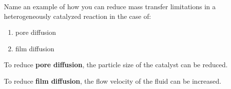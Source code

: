 
\begin{question}
Name an example of how you can reduce mass transfer limitations in a heterogeneously catalyzed reaction in the case of:
\renewcommand{\labelenumi}{(\alph{enumi})}
\begin{enumerate}
\item pore diffusion
\item film diffusion
\end{enumerate}
\end{question}

\begin{solution}
To reduce \textbf{pore diffusion}, the particle size of the catalyst can be reduced. 

To reduce \textbf{film diffusion}, the flow velocity of the fluid can be increased.

\end{solution}
